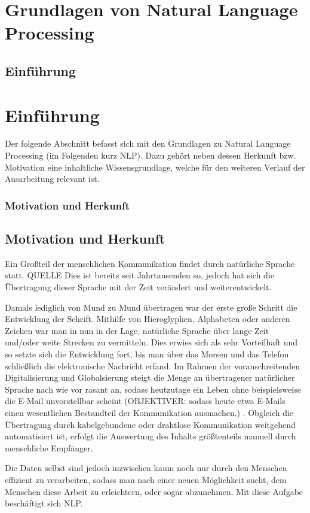 \documentclass[12pt]{paper}
\begin{document}
\section{Grundlagen von Natural Language Processing}
\subsection{Einführung}
\section{Einführung}
Der folgende Abschnitt befasst sich mit den Grundlagen zu Natural Language Processing (im Folgenden kurz NLP). Dazu gehört neben dessen Herkunft bzw. Motivation eine inhaltliche Wissensgrundlage, welche für den weiteren Verlauf der Ausarbeitung relevant ist. 

\subsubsection{Motivation und Herkunft}
\subsection{Motivation und Herkunft}
Ein Großteil der menschlichen Kommunikation findet durch natürliche Sprache statt. QUELLE Dies ist bereits seit Jahrtausenden so, jedoch hat sich die Übertragung dieser Sprache mit der Zeit verändert und weiterentwickelt. 

Damals lediglich von Mund zu Mund übertragen war der erste große Schritt die Entwicklung der Schrift. Mithilfe von Hieroglyphen, Alphabeten oder anderen Zeichen war man in nun in der Lage, natürliche Sprache über lange Zeit und/oder weite Strecken zu vermitteln. Dies erwies sich als sehr Vorteilhaft und so setzte sich die Entwicklung fort, bis man über das Morsen und das Telefon schließlich die elektronische Nachricht erfand. 
Im Rahmen der voranschreitenden Digitalisierung und Globalsierung steigt die Menge an übertragener natürlicher Sprache nach wie vor rasant an, sodass heutzutage ein Leben ohne beispielsweise die E-Mail unvorstellbar scheint (OBJEKTIVER: sodass heute etwa E-Mails einen wesentlichen Bestandteil der Kommunikation ausmachen.) . Obgleich die Übertragung durch kabelgebundene oder drahtlose Kommunikation weitgehend automatisiert ist, erfolgt die Auswertung des Inhalts größtenteils manuell durch menschliche Empfänger.

Die Daten selbst sind jedoch inzwischen kaum noch nur durch den Menschen effizient zu verarbeiten, sodass man nach einer neuen Möglichkeit sucht, dem Menschen diese Arbeit zu erleichtern, oder sogar abzunehmen. Mit diese Aufgabe beschäftigt sich NLP. 
\end{document}
